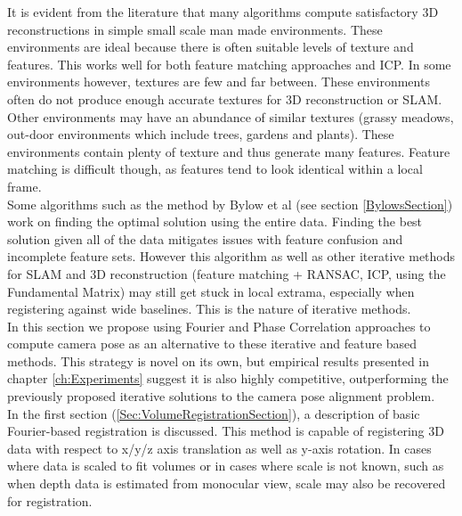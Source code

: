 
It is evident from the literature that many algorithms compute satisfactory 3D reconstructions in simple small scale man made environments. These environments are ideal because there is often suitable levels of texture and features. This works well for both feature matching approaches and ICP. In some environments however, textures are few and far between. These environments often do not produce enough accurate textures for 3D reconstruction or SLAM. \\

Other environments may have an abundance of similar textures (grassy meadows, out-door environments which include trees, gardens and plants). These environments contain plenty of texture and thus generate many features. Feature matching is difficult though, as features tend to look identical within a local frame. \\

Some algorithms such as the method by Bylow et al (see section \ref{BylowsSection}) work on finding the optimal solution using the entire data. Finding the best solution given all of the data mitigates issues with feature confusion and incomplete feature sets. However this algorithm as well as other iterative methods for SLAM and 3D reconstruction (feature matching + RANSAC, ICP, using the Fundamental Matrix) may still get stuck in local extrama, especially when registering against wide baselines. This is the nature of iterative methods. \\

In this section we propose using Fourier and Phase Correlation approaches to compute camera pose as an alternative to these iterative and feature based methods. This strategy is novel on its own, but empirical results presented in chapter \ref{ch:Experiments} suggest it is also highly competitive, outperforming the previously proposed iterative solutions to the camera pose alignment problem. \\

In the first section (\ref{Sec:VolumeRegistrationSection}), a description of basic Fourier-based registration is discussed. This method is capable of registering 3D data with respect to x/y/z axis translation as well as y-axis rotation. In cases where data is scaled to fit volumes or in cases where scale is not known, such as when depth data is estimated from monocular view, scale may also be recovered for registration. \\

